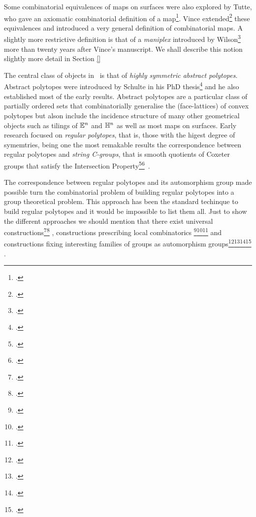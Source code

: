 Some combinatorial equivalences of maps on surfaces were also explored by Tutte, who gave an axiomatic combinatorial definition of a map\footcite{Tutte_1973_WhatIsMap}. Vince extended\footcite{Vince_1983_CombinatorialMaps} these equivalences and introduced a very general definition of combinatorial maps.
A slightly more restrictive definition is that of a \emph{maniplex} introduced by Wilson\footcite{Wilson_2012_ManiplexesPart1} more than twenty years after Vince's manuscript. We shall describe this notion slightly more detail in Section \ref{} \missingref

The central class of objects in \ourp\ is that of \emph{highly symmetric abstract polytopes}. Abstract polytopes were introduced by Schulte in his PhD thesis\footcite{Schulte_1980_RegulareInzidenzkomplexe_PhDThesis} and he also established most of the early results.
Abstract polytopes are a particular class of partially ordered sets that combinatorially generalise the (face-lattices) of convex polytopes but alson include the incidence structure of many other geometrical objects such as tilings of $\mathbb{E}^{n}$ and $\mathbb{H}^{n}$ as well as most maps on surfaces.
Early research focused on \emph{regular polytopes}, that is, those with the higest degree of symemtries, being one the most remakable results the correspondence between regular polytopes and \emph{string C-groups}, that is smooth quotients of Coxeter groups that satisfy the Intersection Property\footcite{DanzerSchulte_1982_RegulareInzidenzkomplexe.I}\footcite{Schulte_1983_RegulareInzidenzkomplexe.Ii}\ .

The correspondence between regular polytopes and its automorphism group made possible turn the combinatorial problem of building regular polytopes into a group theoretical problem. This approach has been the standard techinque to build regular polytopes and it would be impossible to list them all. Just to show the different approaches we should mention that there exist universal constructions\footcite{Schulte_1983_ArrangingRegularIncidence}\footcite{Schulte_1985_ExtensionsRegularComplexes} , constructions prescribing local combinatorics \footcite{Danzer_1984_RegularIncidenceComplexes}\footcite{ Pellicer_2009_ExtensionsRegularPolytopes}\footcite{ Pellicer_2010_ExtensionsDuallyBipartite} and constructions fixing interesting families of groups as automorphism groups\footcite{CameronFernandesLeemansMixer_2017_HighestRankPolytope}\footcite{FernandesLeemans_2018_CGroupsHigh}\footcite{ LeemansMoerenhoutOReillyRegueiro_2017_ProjectiveLinearGroups}\footcite{ Pellicer_2008_CprGraphsRegular} .

